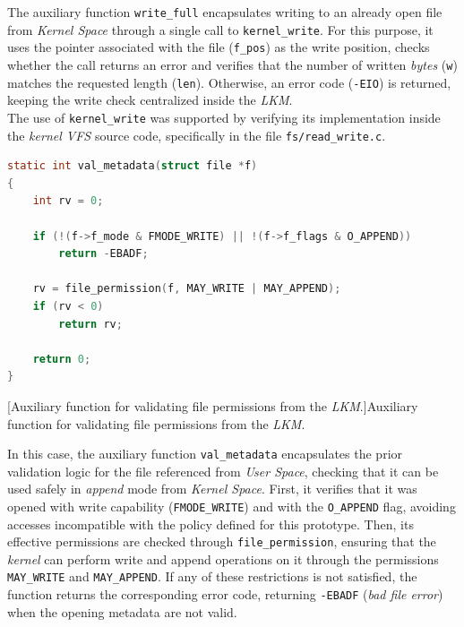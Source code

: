 The auxiliary function \verb|write_full| encapsulates writing to an already open file from \textit{Kernel Space} through a single call to \verb|kernel_write|.
For this purpose, it uses the pointer associated with the file (\verb|f_pos|) as the write position, checks whether the call returns an error and verifies that the number of written \textit{bytes} (\verb|w|) matches the requested length (\verb|len|).
Otherwise, an error code (\texttt{-EIO}) is returned, keeping the write check centralized inside the \textit{LKM}.\\

The use of \verb|kernel_write| was supported by verifying its implementation inside the \textit{kernel VFS} source code, specifically in the file \texttt{fs/read\_write.c}.\\

\begin{lstlisting}[language=C]
static int val_metadata(struct file *f)
{
    int rv = 0;

    if (!(f->f_mode & FMODE_WRITE) || !(f->f_flags & O_APPEND))
        return -EBADF;

    rv = file_permission(f, MAY_WRITE | MAY_APPEND);
    if (rv < 0)
        return rv;

    return 0;
}
\end{lstlisting}
\captionsetup{type=code,justification=centering,singlelinecheck=false}
[Auxiliary function for validating file permissions from the \textit{LKM}.]{Auxiliary function for validating file permissions from the \textit{LKM}.}
\label{cod:file_handoff_val_metadata}
\vspace{\baselineskip}

In this case, the auxiliary function \verb|val_metadata| encapsulates the prior validation logic for the file referenced from \textit{User Space}, checking that it can be used safely in \textit{append} mode from \textit{Kernel Space}.
First, it verifies that it was opened with write capability (\verb|FMODE_WRITE|) and with the \verb|O_APPEND| flag, avoiding accesses incompatible with the policy defined for this prototype.
Then, its effective permissions are checked through \verb|file_permission|, ensuring that the \textit{kernel} can perform write and append operations on it through the permissions \verb|MAY_WRITE| and \verb|MAY_APPEND|.
If any of these restrictions is not satisfied, the function returns the corresponding error code, returning \texttt{-EBADF} (\textit{bad file error}) when the opening metadata are not valid.\\

